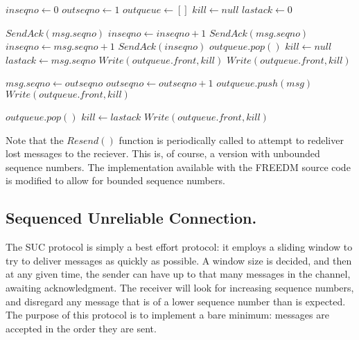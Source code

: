 \begin{algorithmic}

\State $inseqno \gets 0$
\State $outseqno \gets 1$
\State $outqueue \gets []$
\State $kill \gets null$
\State $lastack \gets 0$

            \State $SendAck(msg.seqno)$
            \State $inseqno \gets inseqno + 1$
            \State $SendAck(msg.seqno)$
            \State $inseqno \gets msg.seqno + 1$
        \Else
            \State $SendAck(inseqno)$
        \EndIf
            \State $outqueue.pop()$
            \State $kill \gets null$
            \State $lastack \gets msg.seqno$
            \State $Write(outqueue.front,kill)$
        \Else
            \State $Write(outqueue.front,kill)$
        \EndIf
    \EndIf
\EndFunction

    \State $msg.seqno \gets outseqno$
    \State $outseqno \gets outseqno+1$
    \State $outqueue.push(msg)$
        \State $Write(outqueue.front,kill)$
    \EndIf
\EndFunction

        \State $outqueue.pop()$
        \State $kill \gets lastack$
    \EndWhile
        \State $Write(outqueue.front,kill)$    
    \EndIf
\EndFunction

\end{algorithmic}

Note that the $Resend()$ function is periodically called to attempt to redeliver
lost messages to the reciever. This is, of course, a version with unbounded
sequence numbers. The implementation available with the FREEDM source code is
modified to allow for bounded sequence numbers.

\subsection{Sequenced Unreliable Connection.}

The SUC protocol is simply a best effort protocol: it employs a sliding window 
to try to deliver messages as quickly as possible. A window size is decided, 
and then at any given time, the sender can have up to that many messages in the 
channel, awaiting acknowledgment. The receiver will look for increasing 
sequence numbers, and disregard any message that is of a lower sequence number 
than is expected. The purpose of this protocol is to implement a bare minimum: 
messages are accepted in the order they are sent.

